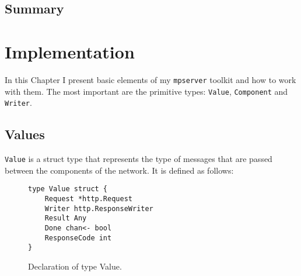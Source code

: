 \documentclass[12pt,a4paper]{article}
\begin{document}
\subsection{Summary}


\newpage
\section{Implementation}
\label{sec:impl}
In this Chapter I present basic elements of my \texttt{mpserver} toolkit
and how to work with them. The most important are the primitive types:
\texttt{Value}, \texttt{Component} and \texttt{Writer}.

\subsection{Values}
\texttt{Value} is a struct type that represents the type of messages that are
passed between the components of the network. It is defined as follows:

\begin{figure}[h]
\centering
\begin{lstlisting}
type Value struct {
    Request *http.Request
    Writer http.ResponseWriter
    Result Any
    Done chan<- bool
    ResponseCode int
}
\end{lstlisting}
\caption[scale=1.0]{Declaration of type Value.}
\label{fig:Value}
\end{figure}
\end{document}
